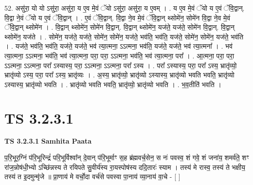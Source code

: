 \documentclass[17pt]{extarticle}
\begin{document}
52. असु॑रा॒ यो यो ऽसु॑रा॒ असु॑रा॒ य ए॒व मे॒वं ॅयो ऽसु॑रा॒ असु॑रा॒ य ए॒वम् । . य ए॒व मे॒वं ॅयो य ए॒वं ॅवि॒द्वान्. वि॒द्वा ने॒वं ॅयो य ए॒वं ॅवि॒द्वान् । . ए॒वं ॅवि॒द्वान्. वि॒द्वा ने॒व मे॒वं ॅवि॒द्वान् थ्सोमे॑न॒ सोमे॑न वि॒द्वा ने॒व मे॒वं ॅवि॒द्वान् थ्सोमे॑न । . वि॒द्वान् थ्सोमे॑न॒ सोमे॑न वि॒द्वान्. वि॒द्वान् थ्सोमे॑न॒ यज॑ते॒ यज॑ते॒ सोमे॑न वि॒द्वान्. वि॒द्वान् थ्सोमे॑न॒ यज॑ते । . सोमे॑न॒ यज॑ते॒ यज॑ते॒ सोमे॑न॒ सोमे॑न॒ यज॑ते॒ भव॑ति॒ भव॑ति॒ यज॑ते॒ सोमे॑न॒ सोमे॑न॒ यज॑ते॒ भव॑ति । . यज॑ते॒ भव॑ति॒ भव॑ति॒ यज॑ते॒ यज॑ते॒ भव॑ त्या॒त्मना॒ ऽऽत्मना॒ भव॑ति॒ यज॑ते॒ यज॑ते॒ भव॑ त्या॒त्मना᳚ । . भव॑ त्या॒त्मना॒ ऽऽत्मना॒ भव॑ति॒ भव॑ त्या॒त्मना॒ परा॒ परा॒ ऽऽत्मना॒ भव॑ति॒ भव॑ त्या॒त्मना॒ परा᳚ । . आ॒त्मना॒ परा॒ परा॒ ऽऽत्मना॒ ऽऽत्मना॒ परा᳚ ऽस्यास्य॒ परा॒ ऽऽत्मना॒ ऽऽत्मना॒ परा᳚ ऽस्य । . परा᳚ ऽस्यास्य॒ परा॒ परा᳚ ऽस्य॒ भ्रातृ॑व्यो॒ भ्रातृ॑व्यो ऽस्य॒ परा॒ परा᳚ ऽस्य॒ भ्रातृ॑व्यः । . अ॒स्य॒ भ्रातृ॑व्यो॒ भ्रातृ॑व्यो ऽस्यास्य॒ भ्रातृ॑व्यो भवति भवति॒ भ्रातृ॑व्यो ऽस्यास्य॒ भ्रातृ॑व्यो भवति । . भ्रातृ॑व्यो भवति भवति॒ भ्रातृ॑व्यो॒ भ्रातृ॑व्यो भवति । . भ॒व॒तीति॑ भवति । \newline
\pagebreak
{}

\section{ TS 3.2.3.1 }

\textbf{TS 3.2.3.1 } \newline
\textbf{Samhita Paata} \newline

प॒रि॒भूर॒ग्निं प॑रि॒भूरिन्द्रं॑ परि॒भूर्विश्वा᳚न् दे॒वान् प॑रि॒भूर्माꣳ स॒ह ब्र॑ह्मवर्च॒सेन॒ स नः॑ पवस्व॒ शं गवे॒ शं जना॑य॒ शमर्व॑ते॒ शꣳ रा॑ज॒न्नोष॑धी॒भ्यो ऽच्छि॑न्नस्य ते रयिपते सु॒वीर्य॑स्य रा॒यस्पोष॑स्य ददि॒तारः॑ स्याम । तस्य॑ मे रास्व॒ तस्य॑ ते भक्षीय॒ तस्य॑ त इ॒दमुन्मृ॑जे ॥ प्रा॒णाय॑ मे वर्चो॒दा वर्च॑से पवस्वा पा॒नाय॑ व्या॒नाय॑ वा॒चे - [  ] \newline
\end{document}
